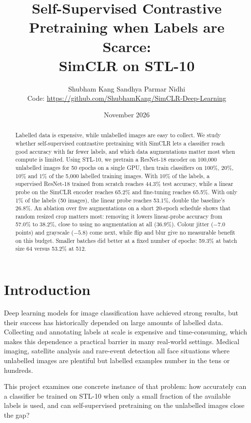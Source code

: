 \documentclass[11pt,a4paper]{article}
\title{Self-Supervised Contrastive Pretraining when Labels are Scarce:\\SimCLR on STL-10}
\author{Shubham Kang \quad Sandhya Parmar \quad Nidhi\\[4pt]
\small Code: \url{https://github.com/ShubhamKang/SimCLR-Deep-Learning}}
\date{November 2026}
\begin{document}
\maketitle

\begin{abstract}
Labelled data is expensive, while unlabelled images are easy to collect. We study whether self-supervised
contrastive pretraining with SimCLR lets a classifier reach good accuracy with far fewer labels, and which
data augmentations matter most when compute is limited. Using STL-10, we pretrain a ResNet-18 encoder on
100,000 unlabelled images for 50 epochs on a single GPU, then train classifiers on 100\%, 20\%, 10\% and 1\%
of the 5,000 labelled training images. With 10\% of the labels, a supervised ResNet-18 trained from scratch
reaches 44.3\% test accuracy, while a linear probe on the SimCLR encoder reaches 65.2\% and fine-tuning
reaches 65.5\%. With only 1\% of the labels (50 images), the linear probe reaches 53.1\%, double the
baseline's 26.8\%. An ablation over five augmentations on a short 20-epoch schedule shows that random resized
crop matters most: removing it lowers linear-probe accuracy from 57.0\% to 38.2\%, close to using no
augmentation at all (36.9\%). Colour jitter ($-7.0$ points) and grayscale ($-5.8$) come next, while flip and
blur give no measurable benefit on this budget. Smaller batches did better at a fixed number of epochs:
59.3\% at batch size 64 versus 53.2\% at 512.
\end{abstract}

\section{Introduction}
Deep learning models for image classification have achieved strong results, but their success has
historically depended on large amounts of labelled data. Collecting and annotating labels at scale is
expensive and time-consuming, which makes this dependence a practical barrier in many real-world settings.
Medical imaging, satellite analysis and rare-event detection all face situations where unlabelled images are
plentiful but labelled examples number in the tens or hundreds.

This project examines one concrete instance of that problem: how accurately can a classifier be trained on
STL-10 when only a small fraction of the available labels is used, and can self-supervised pretraining on the
unlabelled images close the gap?
\end{document}
